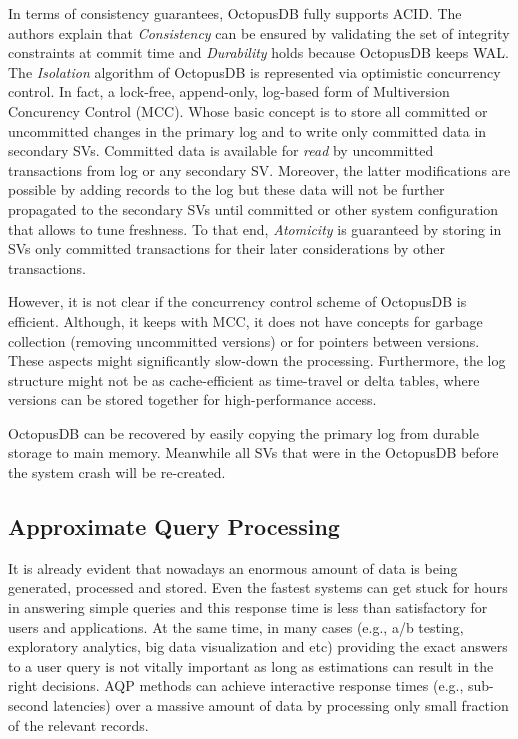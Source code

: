 \documentclass[10pt, conference, compsocconf]{IEEEtran}
\begin{document}
In terms of consistency guarantees, OctopusDB fully supports ACID. The authors explain that \textit{Consistency} can be ensured by validating the set of integrity constraints at commit time and \textit{Durability} holds because OctopusDB keeps WAL. The \textit{Isolation} algorithm of OctopusDB is represented via optimistic concurrency control. In fact, a lock-free, append-only, log-based form of Multiversion Concurency Control (MCC). Whose basic concept is to store all committed or uncommitted changes in the primary log and to write only committed data in secondary SVs. Committed data is available for \textit{read} by uncommitted transactions from log or any secondary SV. Moreover, the latter modifications are possible by adding records to the log but these data will not be further propagated to the secondary SVs until committed or other system configuration that allows to tune freshness. To that end, \textit{Atomicity} is guaranteed by storing in SVs only committed transactions for their later considerations by other transactions.

However, it is not clear if the concurrency control scheme of OctopusDB is efficient. Although, it keeps with MCC, it does not have concepts for garbage collection (removing uncommitted versions) or for pointers between versions. These aspects might significantly slow-down the processing. Furthermore, the log structure might not be as cache-efficient as time-travel or delta tables, where versions can be stored together for high-performance access.

OctopusDB can be recovered by easily copying the primary log from durable storage to main memory. Meanwhile all SVs that were in the OctopusDB before the system crash will be re-created.

\subsection{Approximate Query Processing}

It is already evident that nowadays an enormous amount of data is being generated, processed and stored. Even the fastest systems can get stuck for hours in answering simple queries and this response time is less than satisfactory for users and applications. At the same time, in many cases (e.g., a/b testing, exploratory analytics, big data visualization and etc) providing the exact answers to a user query is not vitally important as long as estimations can result in the right decisions. AQP methods can achieve interactive response times (e.g., sub-second latencies) over a massive amount of data by processing only small fraction of the relevant records. 
\end{document}
